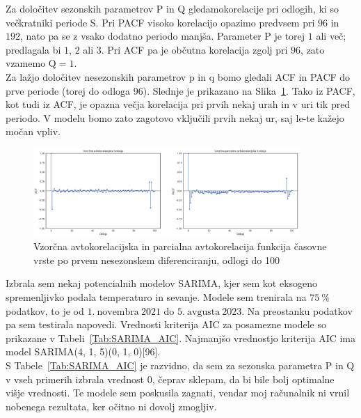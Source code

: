 \documentclass[a4paper, 11pt]{article}
\begin{document}
\noindent Za določitev sezonskih parametrov P in Q gledamokorelacije pri odlogih, ki so večkratniki periode S. Pri
PACF visoko korelacijo opazimo predvsem pri $96$ in $192$, nato pa se z vsako dodatno periodo manjša. Parameter P je torej 
$1$ ali več; predlagala bi $1$, $2$ ali $3$. 
Pri ACF pa je občutna korelacija zgolj pri $96$, zato vzamemo $\text{Q} = 1$. \\

\noindent Za lažjo določitev nesezonskih parametrov p in q bomo gledali ACF in PACF do prve periode (torej do odloga 96). 
Slednje je prikazano na Slika~\ref{fig:ts_diff_2_acf_pacf_do_100}. Tako iz PACF, kot tudi iz ACF, je opazna večja korelacija
pri prvih nekaj urah in v uri tik pred periodo. V modelu bomo zato zagotovo vključili prvih nekaj ur, saj le-te kažejo močan vpliv.

\begin{figure}[h!]
    \caption{Vzorčna avtokorelacijska in parcialna avtokorelacija funkcija časovne vrste po prvem nesezonskem diferenciranju, odlogi do 100}\par\medskip
    \centering
    \label{fig:ts_diff_2_acf_pacf_do_100}
    \includegraphics[width=0.9\textwidth]{ts_diff_2_acf_pacf_do_100.png}
\end{figure}


\noindent Izbrala sem nekaj potencialnih modelov SARIMA, kjer sem kot eksogeno spremenljivko podala temperaturo in sevanje.
Modele sem trenirala na $75~\%$ podatkov, to je od $1.~\text{novembra}~2021$ do $5.~\text{avgusta}~2023$. Na preostanku podatkov 
pa sem testirala napovedi. 
Vrednosti kriterija AIC za posamezne modele so prikazane v Tabeli~\ref{Tab:SARIMA_AIC}. 
Najmanjšo vrednostjo kriterija AIC ima model SARIMA(4, 1, 5)(0, 1, 0)[96]. \\

\noindent S Tabele~\ref{Tab:SARIMA_AIC} je razvidno, da sem za sezonska parametra P in Q v vseh primerih izbrala 
vrednost $0$, čeprav sklepam, da bi bile bolj optimalne višje vrednosti. Te modele sem poskusila zagnati, 
vendar moj računalnik ni vrnil nobenega rezultata, ker očitno ni dovolj zmogljiv. 
\end{document}

